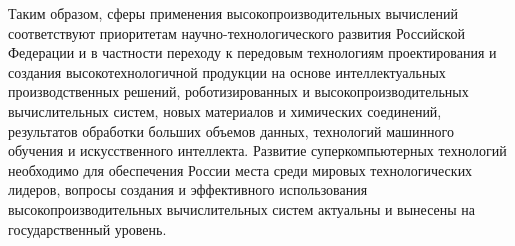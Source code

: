 


Таким образом, сферы применения высокопроизводительных вычислений соответствуют приоритетам научно-технологического развития Российской Федерации и в частности переходу к передовым технологиям проектирования и создания высокотехнологичной продукции на основе интеллектуальных производственных решений, роботизированных и высокопроизводительных вычислительных систем, новых материалов и химических соединений, результатов обработки больших объемов данных, технологий машинного обучения и искусственного интеллекта.
Развитие суперкомпьютерных технологий необходимо для обеспечения России места среди мировых технологических лидеров, вопросы создания и эффективного использования высокопроизводительных вычислительных систем актуальны и вынесены на государственный уровень.

